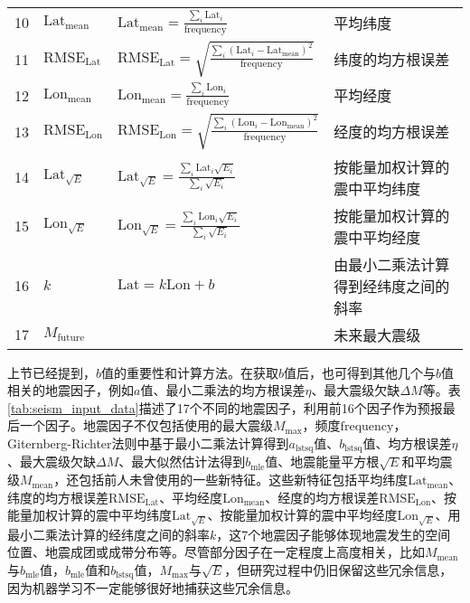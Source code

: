 \begin{sidewaystable}[htpb]
\begin{tabular}{llll}
    10 & $\mathrm{Lat}_{\mathrm{mean}}$ & $\displaystyle \mathrm{Lat}_{\mathrm{mean}}=\frac{\sum_i{\mathrm{Lat}_i}}{\mathrm{frequency}}$ & 平均纬度 \\ 
    11 & $\mathrm{RMSE}_{\mathrm{Lat}}$ & $\displaystyle \mathrm{RMSE}_{\mathrm{Lat}}=\sqrt{\frac{\sum_i{(\mathrm{Lat}_i-\mathrm{Lat}_\mathrm{mean})}^2}{\mathrm{frequency}}}$ & 纬度的均方根误差 \\ 
    12 & $\mathrm{Lon}_{\mathrm{mean}}$ & $\displaystyle \mathrm{Lon}_{\mathrm{mean}}=\frac{\sum_i{\mathrm{Lon}_i}}{\mathrm{frequency}}$ & 平均经度\\ 
    13 & $\mathrm{RMSE}_{\mathrm{Lon}}$ & $\displaystyle \mathrm{RMSE}_{\mathrm{Lon}}=\sqrt{\frac{\sum_i{(\mathrm{Lon}_i-\mathrm{Lon}_\mathrm{mean})}^2}{\mathrm{frequency}}}$ &  经度的均方根误差 \\ 
    14 & $\mathrm{Lat}_{\sqrt{E}}$ & $\displaystyle \mathrm{Lat}_{\sqrt{E}}=\frac{\sum_i{\mathrm{Lat}_i\sqrt{E_i}}}{\sum_i{\sqrt{E_i}}}$ & 按能量加权计算的震中平均纬度 \\ 
    15 & $\mathrm{Lon}_{\sqrt{E}}$ & $\displaystyle \mathrm{Lon}_{\sqrt{E}}=\frac{\sum_i{\mathrm{Lon}_i\sqrt{E_i}}}{\sum_i{\sqrt{E_i}}}$ & 按能量加权计算的震中平均经度 \\ 
    16 & $k$ & $\mathrm{Lat}=k\mathrm{Lon}+b$ & 由最小二乘法计算得到经纬度之间的斜率 \\
    17 & $M_{\mathrm{future}}$ & & 未来最大震级 \\
    \bottomrule
  \end{tabular} 
\end{sidewaystable}

上节已经提到，$b$值的重要性和计算方法。在获取$b$值后，也可得到其他几个与$b$值相关的地震因子，例如$a$值、最小二乘法的均方根误差$\eta$、最大震级欠缺$\Delta M$等。表\ref{tab:seism_input_data}描述了17个不同的地震因子，利用前16个因子作为预报最后一个因子。地震因子不仅包括\citet{Panakkat2007Neural}使用的最大震级$M_{\max}$，频度$\mathrm{frequency}$，Giternberg-Richter法则中基于最小二乘法计算得到$a_{\mathrm{lstsq}}$值、$b_{\mathrm{lstsq}}$值、均方根误差$\eta$、最大震级欠缺$\Delta M$、最大似然估计法得到$b_{\mathrm{mle}}$值、地震能量平方根$\sqrt{E}$和平均震级$M_{\mathrm{mean}}$，还包括前人未曾使用的一些新特征。这些新特征包括平均纬度$\mathrm{Lat}_{\mathrm{mean}}$、纬度的均方根误差$\mathrm{RMSE}_{\mathrm{Lat}}$、平均经度$\mathrm{Lon}_{\mathrm{mean}}$、经度的均方根误差$\mathrm{RMSE}_{\mathrm{Lon}}$、按能量加权计算的震中平均纬度$\mathrm{Lat}_{\sqrt{E}}$、按能量加权计算的震中平均经度$\mathrm{Lon}_{\sqrt{E}}$、用最小二乘法计算的经纬度之间的斜率$k$，这7个地震因子能够体现地震发生的空间位置、地震成团或成带分布等。尽管部分因子在一定程度上高度相关，比如$M_{\mathrm{mean}}$与$b_{\mathrm{mle}}$值，$b_{\mathrm{mle}}$值和$b_{\mathrm{lstsq}}$值，$M_{\max}$与$\sqrt{E}$，但研究过程中仍旧保留这些冗余信息，因为机器学习不一定能够很好地捕获这些冗余信息。

